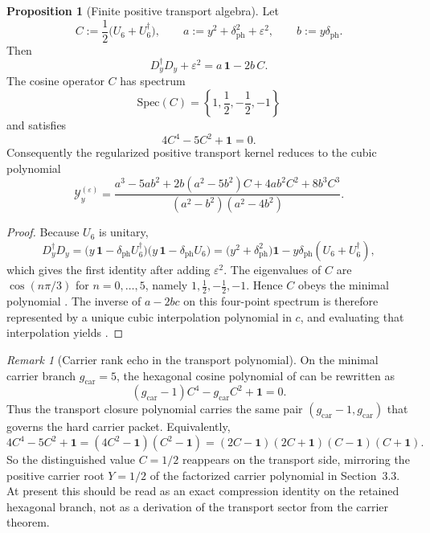 \documentclass[11pt,a4paper]{article}
\theoremstyle{definition}
\newtheorem{proposition}[theorem]{Proposition}
\theoremstyle{remark}
\newtheorem*{remark}{Remark}
\newcommand{\gcar}{g_{\mathrm{car}}}
\begin{document}
\begin{proposition}[Finite positive transport algebra]
\label{prop:finite-positive-transport-algebra}
Let
\[
C:=\frac12\bigl(U_6+U_6^\dagger\bigr),
\qquad
a:=y^2+\delta_{\mathrm{ph}}^2+\varepsilon^2,
\qquad
b:=y\delta_{\mathrm{ph}}.
\]
Then
\[
D_y^\dagger D_y+\varepsilon^2=a\,\mathbf 1-2b\,C.
\]
The cosine operator $C$ has spectrum
\[
\mathrm{Spec}(C)=\left\{1,\frac12,-\frac12,-1\right\}
\]
and satisfies
\begin{equation}
\label{eq:c6-cosine-polynomial}
4C^4-5C^2+\mathbf 1=0.
\end{equation}
Consequently the regularized positive transport kernel reduces to the cubic polynomial
\begin{equation}
\label{eq:finite-positive-transport-kernel}
\mathcal Y_y^{(\varepsilon)}
=
\frac{
a^3-5ab^2
+2b(a^2-5b^2)C
+4ab^2C^2
+8b^3C^3
}{
(a^2-b^2)(a^2-4b^2)
}.
\end{equation}
\end{proposition}

\begin{proof}
Because $U_6$ is unitary,
\[
D_y^\dagger D_y
=
\bigl(y\,\mathbf 1-\delta_{\mathrm{ph}}U_6^\dagger\bigr)
\bigl(y\,\mathbf 1-\delta_{\mathrm{ph}}U_6\bigr)
=
\bigl(y^2+\delta_{\mathrm{ph}}^2\bigr)\mathbf 1
-y\delta_{\mathrm{ph}}(U_6+U_6^\dagger),
\]
which gives the first identity after adding $\varepsilon^2$. The eigenvalues of $C$ are $\cos(n\pi/3)$ for $n=0,\dots,5$, namely $1,\frac12,-\frac12,-1$. Hence $C$ obeys the minimal polynomial . The inverse of $a-2bc$ on this four-point spectrum is therefore represented by a unique cubic interpolation polynomial in $c$, and evaluating that interpolation yields .
\end{proof}

\begin{remark}[Carrier rank echo in the transport polynomial]\label{rem:transport-rank-echo}
On the minimal carrier branch $\gcar=5$, the hexagonal cosine polynomial of  can be rewritten as
\[
(\gcar-1)C^4-\gcar C^2+\mathbf 1=0.
\]
Thus the transport closure polynomial carries the same pair $(\gcar-1,\gcar)$ that governs the hard carrier packet. Equivalently,
\[
4C^4-5C^2+\mathbf 1=(4C^2-\mathbf 1)(C^2-\mathbf 1)=(2C-\mathbf 1)(2C+\mathbf 1)(C-\mathbf 1)(C+\mathbf 1).
\]
So the distinguished value $C=1/2$ reappears on the transport side, mirroring the positive carrier root $Y=1/2$ of the factorized carrier polynomial in Section~3.3. At present this should be read as an exact compression identity on the retained hexagonal branch, not as a derivation of the transport sector from the carrier theorem.
\end{remark}
\end{document}
